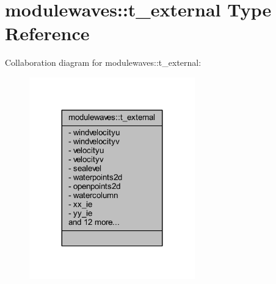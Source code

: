 \hypertarget{structmodulewaves_1_1t__external}{}\section{modulewaves\+:\+:t\+\_\+external Type Reference}
\label{structmodulewaves_1_1t__external}


Collaboration diagram for modulewaves\+:\+:t\+\_\+external\+:\nopagebreak
\begin{figure}[H]
\begin{center}
\leavevmode
\includegraphics[width=203pt]{structmodulewaves_1_1t__external__coll__graph}
\end{center}
\end{figure}
